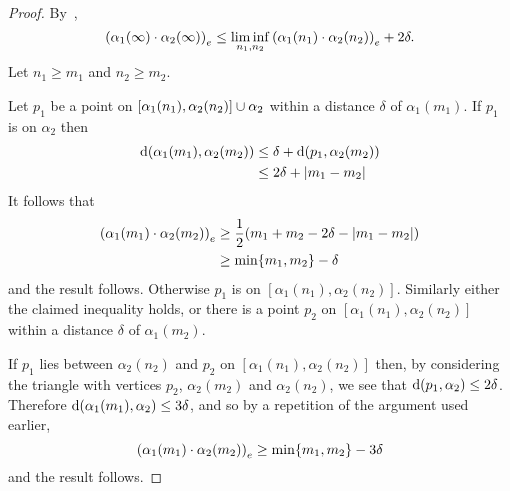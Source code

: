 \documentclass[a4paper]{article}
\begin{document}
\begin{proof}
  By~\cite[III.H.3.17]{bridsonhaefliger99},
  \begin{equation*}
    \gromov{e}{\alpha_1(\infty)}{\alpha_2(\infty)} \leq \liminf_{n_1, n_2}
        \gromov{e}{\alpha_1(n_1)}{\alpha_2(n_2)} + 2\delta.
  \end{equation*}
  Let $n_1 \geq m_1$ and $n_2 \geq m_2$. 
  
  Let $p_1$ be a point on $[\alpha_1(n_1), \alpha_2(n_2)] \union \alpha_2$
  within a distance $\delta$ of $\alpha_1(m_1)$.  If $p_1$ is on $\alpha_2$
  then
  \begin{align*}
    \dist(\alpha_1(m_1), \alpha_2(m_2)) 
      & \leq \delta + \dist(p_1, \alpha_2(m_2)) \\
      & \leq 2\delta + \abs{m_1 - m_2}
  \end{align*}
  It follows that
  \begin{align*}
    \gromov{e}{\alpha_1(m_1)}{\alpha_2(m_2)} 
      &\geq \frac{1}{2}(m_1 + m_2 - 2\delta - \abs{m_1 - m_2})\\
      &\geq \min\{m_1, m_2\} - \delta
  \end{align*} 
  and the result follows. Otherwise $p_1$ is on $[\alpha_1(n_1),
  \alpha_2(n_2)]$. Similarly either the claimed inequality holds, or there is a
  point $p_2$ on $[\alpha_1(n_1), \alpha_2(n_2)]$ within a distance $\delta$ of
  $\alpha_1(m_2)$.
  
  If $p_1$ lies between $\alpha_2(n_2)$ and $p_2$ on $[\alpha_1(n_1),
  \alpha_2(n_2)]$ then, by considering the triangle with vertices $p_2$,
  $\alpha_2(m_2)$ and $\alpha_2(n_2)$, we see that $\dist(p_1, \alpha_2) \leq
  2\delta$. Therefore $\dist(\alpha_1(m_1), \alpha_2) \leq 3\delta$, and so by
  a repetition of the argument used earlier,
  \begin{equation*}
    \gromov{e}{\alpha_1(m_1)}{\alpha_2(m_2)} \geq \min\{m_1, m_2\} - 3\delta
  \end{equation*}
  and the result follows.


\end{proof}
\end{document}

